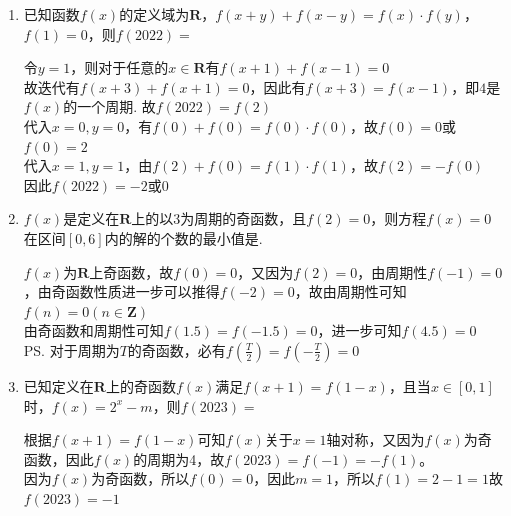 \begin{enumerate}
        \begin{jieda}
            $f(x) = -f(\pi - x)$即$f(x)$关于$(\frac{\pi}{2}, 0)$中心对称，又因为$f(x)$是偶函数，所以$2\pi$是$f(x)$的一个周期. 因为定义域为$\mathbf{R}$，所以$f(\frac{k\pi}{2}) = 0, k \in \mathbf{Z}$；结合图像可知有9个零点 \\
        \ps 两个横坐标不同位置的对称性会产生周期性
        \begin{enumerate}
            \item 两个对称轴的横坐标之差的二倍是函数的周期：$f(x) = f(2a-x), f(x) = f(2b - x) \Leftrightarrow 2|a-b|$是$f(x)$的一个周期。
            \item 两个纵坐标相同的对称中心的横坐标之差的二倍是函数的周期：$f(x) + f(2a-x) = 2m, f(x) + f(2b - x) = 2m \Leftrightarrow 2|a-b|$是$f(x)$的一个周期。
            \item 一个对称轴和一个对称中心的横坐标之差的四倍是函数的周期：$f(x) = f(2a-x), f(x) + f(2b - x) = 2m \Leftrightarrow 4|a-b|$是$f(x)$的一个周期。
        \end{enumerate}
        \end{jieda}
        \item 已知函数$f(x)$的定义域为$\mathbf{R}$，$f(x+y)+f(x-y) = f(x) \cdot f(y)$，$f(1) = 0$，则$f(2022) = $
        \begin{jieda}
            令$y = 1$，则对于任意的$x \in \mathbf{R}$有$f(x+1) + f(x-1) = 0$ \\ 故迭代有$f(x+3) + f(x+1) = 0$，因此有$f(x + 3) = f(x-1)$，即$4$是$f(x)$的一个周期. 故$f(2022) = f(2)$\\
            代入$x = 0, y = 0$，有$f(0) + f(0) = f(0) \cdot f(0)$，故$f(0) = 0$或$f(0) = 2$ \\
            代入$x = 1, y = 1$，由$f(2) + f(0) = f(1) \cdot f(1)$，故$f(2) = -f(0)$ \\
            因此$f(2022) = -2 \mbox{或} 0$
        \end{jieda}
        \item $f(x)$是定义在$\mathbf{R}$上的以3为周期的奇函数，且$f(2) = 0$，则方程$f(x) = 0$在区间$[0, 6]$内的解的个数的最小值是. 
        \begin{jieda}
            $f(x)$为$\mathbf{R}$上奇函数，故$f(0) = 0$，又因为$f(2) = 0$，由周期性$f(-1) = 0$，由奇函数性质进一步可以推得$f(-2) = 0$，故由周期性可知$f(n) = 0 (n \in \mathbf{Z})$ \\
            由奇函数和周期性可知$f(1.5) = f(-1.5) = 0$，进一步可知$f(4.5) = 0$ \\
            \ps 对于周期为$T$的奇函数，必有$f(\frac{T}{2}) = f(-\frac{T}{2}) = 0$
        \end{jieda}
        \item 已知定义在$\mathbf{R}$上的奇函数$f(x)$满足$f(x+1) = f(1-x)$，且当$x \in [0, 1]$时，$f(x) = 2^x - m$，则$f(2023) =$ 
        \begin{jieda}
            根据$f(x+1) = f(1-x)$可知$f(x)$关于$x = 1$轴对称，又因为$f(x)$为奇函数，因此$f(x)$的周期为4，故$f(2023) = f(-1) = -f(1)$。\\
            因为$f(x)$为奇函数，所以$f(0) = 0$，因此$m = 1$，所以$f(1) = 2 - 1 = 1$故$f(2023) = -1$
        \end{jieda}
    \end{enumerate}
